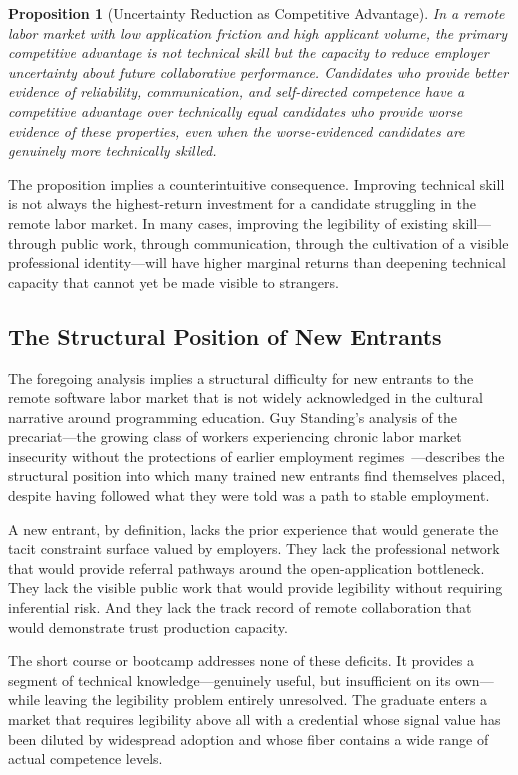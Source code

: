 \documentclass[12pt, a4paper]{article}
\theoremstyle{plain}
\newtheorem{proposition}{Proposition}[section]
\theoremstyle{definition}
\theoremstyle{remark}
\begin{document}
\begin{proposition}[Uncertainty Reduction as Competitive Advantage]
In a remote labor market with low application friction and high applicant volume,
the primary competitive advantage is not technical skill but
the capacity to reduce employer uncertainty about future collaborative performance.
Candidates who provide better evidence of reliability, communication,
and self-directed competence have a competitive advantage over
technically equal candidates who provide worse evidence of these properties,
even when the worse-evidenced candidates are genuinely more technically skilled.
\end{proposition}

The proposition implies a counterintuitive consequence.
Improving technical skill is not always the highest-return investment
for a candidate struggling in the remote labor market.
In many cases, improving the legibility of existing skill---through public work,
through communication, through the cultivation of a visible professional identity---will
have higher marginal returns than deepening technical capacity
that cannot yet be made visible to strangers.

\subsection{The Structural Position of New Entrants}

The foregoing analysis implies a structural difficulty for new entrants
to the remote software labor market that is not widely acknowledged
in the cultural narrative around programming education.
Guy Standing's analysis of the precariat---the growing class of workers
experiencing chronic labor market insecurity without the protections
of earlier employment regimes~\cite{standing2011}---describes the structural
position into which many trained new entrants find themselves placed,
despite having followed what they were told was a path to stable employment.

A new entrant, by definition, lacks the prior experience that would
generate the tacit constraint surface valued by employers.
They lack the professional network that would provide referral pathways
around the open-application bottleneck.
They lack the visible public work that would provide legibility
without requiring inferential risk.
And they lack the track record of remote collaboration
that would demonstrate trust production capacity.

The short course or bootcamp addresses none of these deficits.
It provides a segment of technical knowledge---genuinely useful,
but insufficient on its own---while leaving the legibility problem entirely unresolved.
The graduate enters a market that requires legibility above all
with a credential whose signal value has been diluted by widespread adoption
and whose fiber contains a wide range of actual competence levels.
\end{document}
